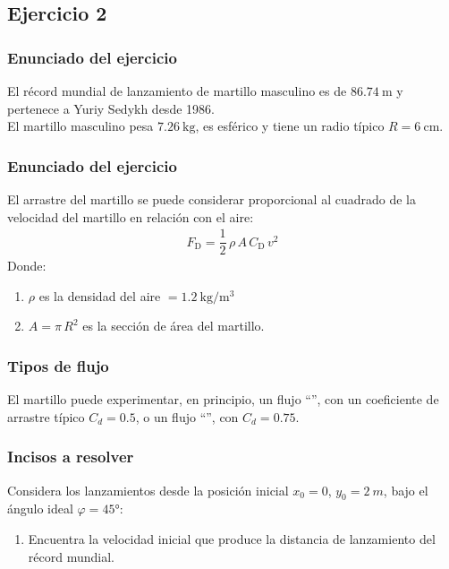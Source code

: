 \documentclass[12pt]{beamer}
\begin{document}
\subsection{Ejercicio 2}

\begin{frame}
\frametitle{Enunciado del ejercicio}
El récord mundial de lanzamiento de martillo masculino es de $\SI{86.74}{\meter}$ y pertenece a Yuriy Sedykh desde 1986.
\\
\bigskip
\pause
El martillo masculino pesa $\SI{7.26}{\kilo\gram}$, es esférico y tiene un radio típico $R = \SI{6}{\centi\meter}$.
\end{frame}
\begin{frame}
\frametitle{Enunciado del ejercicio}
El arrastre del martillo se puede considerar proporcional al cuadrado de la velocidad del martillo en relación con el aire:
\pause
\begin{align*}
F_{\text{D}} = \dfrac{1}{2} \, \rho \, A \, C_{\text{D}} \, v^{2}
\end{align*}
\pause
Donde:
\begin{enumerate}[<+->]
\item $\rho$ es la densidad del aire $= \SI{1.2}{\kilo\gram\per\cubic\meter}$
\item $A = \pi \, R^{2}$ es la sección de área del martillo.
\end{enumerate}
\end{frame}
\begin{frame}
\frametitle{Tipos de flujo}
El martillo puede experimentar, en principio, un flujo \enquote{}, con un coeficiente de arrastre típico $C_{d} = 0.5$, \pause o un flujo \enquote{}, con $C_{d} = 0.75$.
\end{frame}
\begin{frame}
\frametitle{Incisos a resolver}
Considera los lanzamientos desde la posición inicial $x_{0} = 0$, $y_{0} = \SI{2}{m}$, bajo el ángulo ideal $\varphi = \ang{45}$:
\pause
{}
\begin{enumerate}[<+->]
\item Encuentra la velocidad inicial que produce la distancia de lanzamiento del récord mundial.
\seti
\end{enumerate}
\end{frame}
\end{document}
